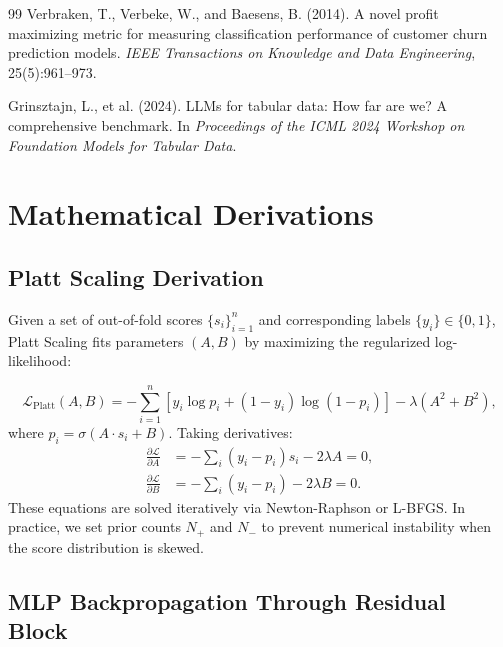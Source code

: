 \documentclass[12pt, a4paper]{article}
\begin{document}
\begin{thebibliography}{99}
Verbraken, T., Verbeke, W., and Baesens, B. (2014).
\newblock A novel profit maximizing metric for measuring classification performance of customer churn prediction models.
\newblock \emph{IEEE Transactions on Knowledge and Data Engineering}, 25(5):961--973.

Grinsztajn, L., et al. (2024).
\newblock LLMs for tabular data: How far are we? A comprehensive benchmark.
\newblock In \emph{Proceedings of the ICML 2024 Workshop on Foundation Models for Tabular Data}.

\end{thebibliography}


\appendix
\renewcommand{\thetable}{A\arabic{table}}
\renewcommand{\thefigure}{A\arabic{figure}}

\section{Mathematical Derivations}\label{app:mlp_deriv}

\subsection{Platt Scaling Derivation}

Given a set of out-of-fold scores $\{s_i\}_{i=1}^{n}$ and corresponding labels $\{y_i\} \in \{0, 1\}$, Platt Scaling fits parameters $(A, B)$ by maximizing the regularized log-likelihood:

\begin{equation}
\mathcal{L}_{\text{Platt}}(A, B) = -\sum_{i=1}^{n} \left[ y_i \log p_i + (1-y_i)\log(1-p_i) \right] - \lambda(A^2 + B^2),
\end{equation}
where $p_i = \sigma(A \cdot s_i + B)$. Taking derivatives:
\begin{align}
\frac{\partial \mathcal{L}}{\partial A} &= -\sum_i (y_i - p_i) s_i - 2\lambda A = 0, \\
\frac{\partial \mathcal{L}}{\partial B} &= -\sum_i (y_i - p_i) - 2\lambda B = 0.
\end{align}
These equations are solved iteratively via Newton-Raphson or L-BFGS. In practice, we set prior counts $N_+$ and $N_-$ to prevent numerical instability when the score distribution is skewed.

\subsection{MLP Backpropagation Through Residual Block}
\end{document}
